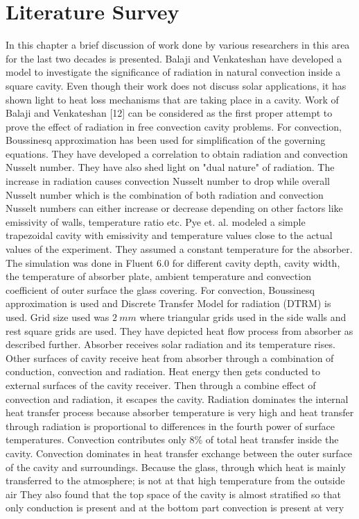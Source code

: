 \chapter{Literature Survey} \label{ch2}
In this chapter a brief discussion of work done by various researchers in this area for the last two decades is presented. Balaji and Venkateshan\citep{BALAJI1993260} have developed a model to investigate the significance of radiation in natural convection inside a square cavity. Even though their work does not discuss solar applications, it has shown light to heat loss mechanisms that are taking place in a cavity. Work of Balaji and Venkateshan [12] can be considered as the first proper attempt to prove the effect of radiation in free convection cavity problems. For convection, Boussinesq approximation has been used for simplification of the governing equations. They have developed a correlation to obtain radiation and convection Nusselt number. They have also shed light on "dual nature" of radiation. The increase in radiation causes convection Nusselt number to drop while overall Nusselt number which is the combination of both radiation and convection Nusselt numbers can either increase or decrease depending on other factors like emissivity of walls, temperature ratio etc. Pye et. al.\cite{pye2003modelling} modeled a simple trapezoidal cavity with emissivity and temperature values close to the actual values of the experiment. They assumed a constant temperature for the absorber. The simulation was done in Fluent 6.0 for different cavity depth, cavity width, the temperature of absorber plate, ambient temperature and convection coefficient of outer surface the glass covering. For convection, Boussinesq approximation is used and Discrete Transfer Model for radiation (DTRM) is used. Grid size used was $2\ mm$ where triangular grids used in the side walls and rest square grids are used. They have depicted heat flow process from absorber as described further. Absorber receives solar radiation and its temperature rises. Other surfaces of cavity receive heat from absorber through a combination of conduction, convection and radiation. Heat energy then gets conducted to external surfaces of the cavity receiver. Then through a combine effect of convection and radiation, it escapes the cavity. Radiation dominates the internal heat transfer process because absorber temperature is very high and heat transfer through radiation is proportional to differences in the fourth power of surface temperatures. Convection contributes only 8\% of total heat transfer inside the cavity. Convection dominates in heat transfer exchange between the outer surface of the cavity and surroundings. Because the glass, through which heat is mainly transferred to the atmosphere; is not at that high temperature from the outside air They also found that the top space of the cavity is almost stratified so that only conduction is present and at the bottom part convection is present at very
